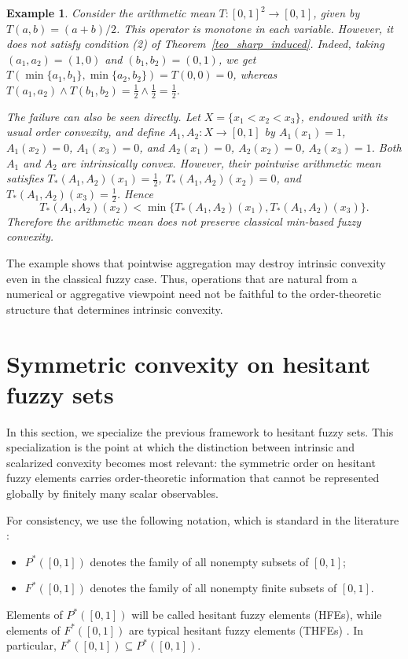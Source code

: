 \documentclass[11pt,a4paper]{article}
\newtheorem{example}{Example}
\begin{document}
\begin{example}\label{ex6}
Consider the arithmetic mean \(T:[0,1]^2\to[0,1]\), given by \(T(a,b)=(a+b)/2\). This operator is monotone in each variable. However, it does not satisfy condition (2) of Theorem~\ref{teo_sharp_induced}. Indeed, taking \((a_1,a_2)=(1,0)\) and \((b_1,b_2)=(0,1)\), we get
\(T(\min\{a_1,b_1\},\min\{a_2,b_2\})=T(0,0)=0\), whereas
\(T(a_1,a_2)\wedge T(b_1,b_2)=\frac12\wedge\frac12=\frac12\).

The failure can also be seen directly. Let \(X=\{x_1<x_2<x_3\}\), endowed with its usual order convexity, and define \(A_1,A_2:X\to[0,1]\) by
\(A_1(x_1)=1\), \(A_1(x_2)=0\), \(A_1(x_3)=0\), and
\(A_2(x_1)=0\), \(A_2(x_2)=0\), \(A_2(x_3)=1\).
Both \(A_1\) and \(A_2\) are intrinsically convex. However, their pointwise arithmetic mean satisfies
\(T_*(A_1,A_2)(x_1)=\frac12\), \(T_*(A_1,A_2)(x_2)=0\), and
\(T_*(A_1,A_2)(x_3)=\frac12\). Hence
\[
T_*(A_1,A_2)(x_2)
<
\min\{T_*(A_1,A_2)(x_1),T_*(A_1,A_2)(x_3)\}.
\]
Therefore the arithmetic mean does not preserve classical min-based fuzzy convexity.
\end{example}

The example shows that pointwise aggregation may destroy intrinsic convexity even in the classical fuzzy case. Thus, operations that are natural from a numerical or aggregative viewpoint need not be faithful to the order-theoretic structure that determines intrinsic convexity. %









\section{Symmetric convexity on hesitant fuzzy sets}\label{sec:hesitant}

In this section, we specialize the previous framework to hesitant fuzzy sets. This specialization is the point at which the distinction between intrinsic and scalarized convexity becomes most relevant: the symmetric order on hesitant fuzzy elements carries order-theoretic information that cannot be represented globally by finitely many scalar observables.

\smallskip

For consistency, we use the following notation, which is standard in the literature \citep{Alcantud,AlcantudTorra19,MerinoNavarroSalvatierraSantos2026}:
\begin{itemize}
    \item \(P^*([0,1])\) denotes the family of all nonempty subsets of \([0,1]\);
    \item \(F^*([0,1])\) denotes the family of all nonempty finite subsets of \([0,1]\).
\end{itemize}
Elements of \(P^*([0,1])\) will be called hesitant fuzzy elements (HFEs), while elements of \(F^*([0,1])\) are typical hesitant fuzzy elements (THFEs) \cite[Def.~3.1]{Bedregal2014}. In particular, \(F^*([0,1])\subseteq P^*([0,1])\).
\end{document}
